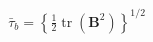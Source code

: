 \documentclass[preview]{standalone}
\begin{document}
\begin{align*}
\bar{\tau}_b = \left\{\tfrac{1}{2}\operatorname{tr}(\mathbf{B}^2)\right\}^{1/2}
\end{align*}
\end{document}
